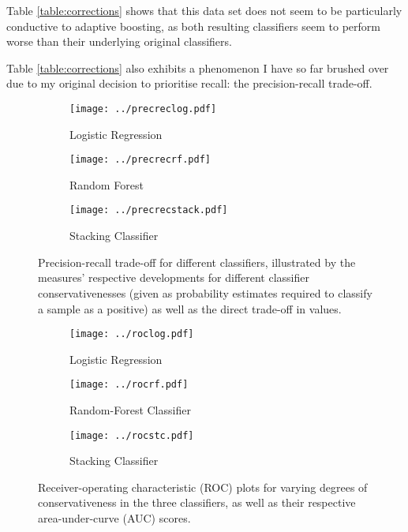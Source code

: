 \documentclass[10pt, twoside, a4paper]{article}
\begin{document}
	Table \ref{table:corrections} shows that this data set does not seem to be particularly 
	conductive to adaptive boosting, as both resulting classifiers seem to perform worse than
	their underlying original classifiers. 

	Table \ref{table:corrections} also exhibits a phenomenon I have so far brushed over due to my original 
	decision to prioritise recall: the precision-recall trade-off.

	\begin{figure}

	\begin{subfigure}{\textwidth}
		\texttt{[image: ../precreclog.pdf]}
		\caption{Logistic Regression}
	\end{subfigure}
	\begin{subfigure}{\textwidth}
		\texttt{[image: ../precrecrf.pdf]}
		\caption{Random Forest}
	\end{subfigure}
	\begin{subfigure}{\textwidth}
		\texttt{[image: ../precrecstack.pdf]}
		\caption{Stacking Classifier}
	\end{subfigure}
	\caption{Precision-recall trade-off for different classifiers, illustrated by the
	measures' respective developments for different classifier conservativenesses (given 
	as probability estimates required to classify a sample as a positive) as
	well as the direct trade-off in values.}
	\label{figure:precisionrecall}
	\end{figure}
	\begin{figure}
	\begin{center}
	\begin{subfigure}{.33\textwidth}
		\texttt{[image: ../roclog.pdf]}
		\caption{Logistic Regression}
	\end{subfigure}%
	\begin{subfigure}{.33\textwidth}
		\texttt{[image: ../rocrf.pdf]}
		\caption{Random-Forest Classifier}
	\end{subfigure}%
	\begin{subfigure}{.33\textwidth}
		\texttt{[image: ../rocstc.pdf]}
		\caption{Stacking Classifier}
	\end{subfigure}%
	\end{center}
	\caption{Receiver-operating characteristic (ROC) plots for varying degrees of conservativeness 
	in the three classifiers, as well as their respective area-under-curve (AUC) scores.}
	\label{figure:rocs}
	\end{figure}
\end{document}
